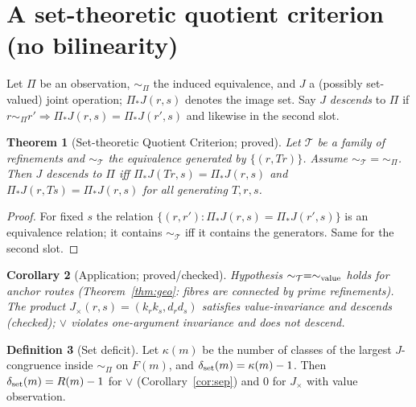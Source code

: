 \documentclass[11pt,a4paper]{article}
\newtheorem{theorem}{Theorem}[section]
\newtheorem{corollary}[theorem]{Corollary}
\theoremstyle{definition}
\newtheorem{definition}[theorem]{Definition}
\newcommand{\vj}{\mathbin{\vee}}
\begin{document}
\section{A set-theoretic quotient criterion (no bilinearity)}
Let $\Pi$ be an observation, $\sim_\Pi$ the induced equivalence, and $J$ a (possibly set-valued) joint operation; $\Pi_*J(r,s)$ denotes the image set. Say $J$ \emph{descends} to $\Pi$ if $r\sim_\Pi r'\Rightarrow \Pi_*J(r,s)=\Pi_*J(r',s)$ and likewise in the second slot.
\begin{theorem}[Set-theoretic Quotient Criterion; proved]\label{thm:setq}
Let $\mathcal T$ be a family of refinements and $\sim_{\mathcal T}$ the equivalence generated by $\{(r,Tr)\}$. Assume $\sim_{\mathcal T}=\sim_\Pi$. Then $J$ descends to $\Pi$ iff $\Pi_*J(Tr,s)=\Pi_*J(r,s)$ and $\Pi_*J(r,Ts)=\Pi_*J(r,s)$ for all generating $T,r,s$.
\end{theorem}
\begin{proof}
For fixed $s$ the relation $\{(r,r'):\Pi_*J(r,s)=\Pi_*J(r',s)\}$ is an equivalence relation; it contains $\sim_{\mathcal T}$ iff it contains the generators. Same for the second slot.
\end{proof}
\begin{corollary}[Application; proved/checked]
Hypothesis $\sim_{\mathcal T}=\sim_{\rm value}$ holds for anchor routes (Theorem~\ref{thm:geo}: fibres are connected by prime refinements). The product $J_\times(r,s)=(k_rk_s,d_rd_s)$ satisfies value-invariance and descends (checked); $\vj$ violates one-argument invariance and does not descend.
\end{corollary}
\begin{definition}[Set deficit]
Let $\kappa(m)$ be the number of classes of the largest $J$-congruence inside $\sim_\Pi$ on $F(m)$, and $\delta_{\rm set}(m)=\kappa(m)-1$. Then $\delta_{\rm set}(m)=R(m)-1$ for $\vj$ (Corollary~\ref{cor:sep}) and $0$ for $J_\times$ with value observation.
\end{definition}
\end{document}

